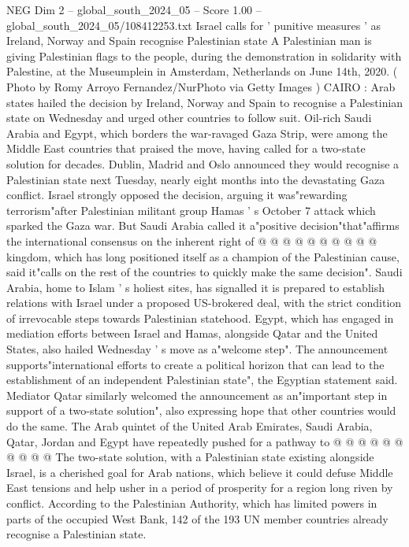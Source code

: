 \begin{textsample}{NEG Dim 2 – global\_south\_2024\_05 – Score 1.00 – global\_south\_2024\_05/108412253.txt}  \label{ex:f2_neg_374}
Israel calls for ' punitive measures ' as Ireland, Norway and Spain recognise Palestinian state A Palestinian man is giving Palestinian flags to the people, during the demonstration in solidarity with Palestine, at the Museumplein in Amsterdam, Netherlands on June 14th, 2020. ( Photo by Romy Arroyo Fernandez/NurPhoto via Getty Images ) CAIRO : Arab states hailed the decision by Ireland, Norway and Spain to recognise a Palestinian state on Wednesday and urged other countries to follow suit.
Oil-rich Saudi Arabia and Egypt, which borders the war-ravaged Gaza Strip, were among the Middle East countries that praised the move, having called for a two-state solution for decades.
Dublin, Madrid and Oslo announced they would recognise a Palestinian state next Tuesday, nearly eight months into the devastating Gaza conflict.
Israel strongly opposed the decision, arguing it was"rewarding terrorism"after Palestinian militant group Hamas ' s October 7 attack which sparked the Gaza war.
But Saudi Arabia called it a"positive decision"that"affirms the international consensus on the inherent right of @ @ @ @ @ @ @ @ @ @ kingdom, which has long positioned itself as a champion of the Palestinian cause, said it"calls on the rest of the countries to quickly make the same decision".
Saudi Arabia, home to Islam ' s holiest sites, has signalled it is prepared to establish relations with Israel under a proposed US-brokered deal, with the strict condition of irrevocable steps towards Palestinian statehood.
Egypt, which has engaged in mediation efforts between Israel and Hamas, alongside Qatar and the United States, also hailed Wednesday ' s move as a"welcome step".
The announcement supports"international efforts to create a political horizon that can lead to the establishment of an independent Palestinian state", the Egyptian statement said.
Mediator Qatar similarly welcomed the announcement as an"important step in support of a two-state solution", also expressing hope that other countries would do the same.
The Arab quintet of the United Arab Emirates, Saudi Arabia, Qatar, Jordan and Egypt have repeatedly pushed for a pathway to @ @ @ @ @ @ @ @ @ @ The two-state solution, with a Palestinian state existing alongside Israel, is a cherished goal for Arab nations, which believe it could defuse Middle East tensions and help usher in a period of prosperity for a region long riven by conflict.
According to the Palestinian Authority, which has limited powers in parts of the occupied West Bank, 142 of the 193 UN member countries already recognise a Palestinian state.

\end{textsample}
